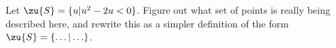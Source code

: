 Let $\zu{S}=\{u|u^2-2u<0\}$. Figure out what set of points is
really being described here, and rewrite this as a simpler
definition of the form $\zu{S}=\{\ldots|\ldots\}$.
